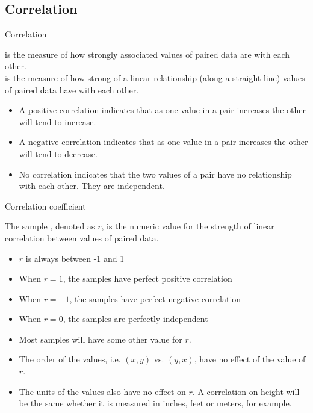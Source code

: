 \documentclass[xcolor=table, aspectratio=169, bigger, handout]{beamer}
\begin{document}
%
%
\subsection{Correlation}

\begin{frame}{Correlation}
\begin{block}{}
 is the measure of how strongly associated values of paired data are with each other.\\
\pause\medskip
{} is the measure of how strong of a linear relationship (along a straight line)  values of paired data have with each other. 
\begin{itemize}
\pause\item A positive correlation indicates that as one value in a pair increases the other will tend to increase.
\pause\item A negative correlation indicates that as one value in a pair increases the other will tend to decrease.
\pause\item No correlation indicates that the two values of a pair have no relationship with each other. They are independent.
\end{itemize}
\end{block}
\end{frame}

\begin{frame}{Correlation coefficient}
\begin{block}{}
The sample , denoted as $r$, is the numeric value for the strength of linear correlation between values of paired data.
\begin{itemize}
\pause\item $r$ is always between -1 and 1
\pause\item When $r=1$, the samples have perfect positive correlation
\pause\item When $r=-1$, the samples have perfect negative correlation
\pause\item When $r=0$, the samples are perfectly independent
\pause\item Most samples will have some other value for $r$. 
\pause\item The order of the values, i.e. $(x,y)$ vs. $(y,x)$, have no effect of the value of $r$.
\pause\item The units of the values also have no effect on $r$. A correlation on height will be the same whether it is measured in inches, feet or meters, for example.
\end{itemize}
\end{block}
\end{frame}
\end{document}
